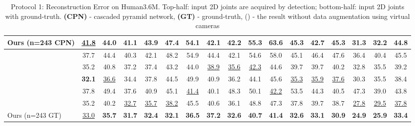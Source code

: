 \documentclass[twocolumn]{svjour3}          \smartqed  \usepackage{graphicx}
\begin{document}
\begin{table*}
\begin{center}
{\begin{tabular}{l|ccccccccccccccc|c}
			\midrule
			Ours (n=243 CPN) &  \underline{41.8} &\textbf{44.0} & \textbf{41.1} & \textbf{43.9} & \textbf{47.4} &\textbf{54.1} & \textbf{42.1} &  \textbf{42.2} & \textbf{55.3} & \textbf{63.6} & \textbf{45.3} & \textbf{42.7} & 45.3 & \textbf{31.3} & \textbf{32.2} & \textbf{44.8}\\
          \midrule
			\midrule
\citep{Martinez2017} & 37.7 & 44.4 & 40.3 & 42.1 & 48.2 & 54.9 & 44.4 & 42.1 & 54.6 & 58.0 & 45.1 & 46.4 & 47.6 & 36.4 & 40.4 & 45.5 \\
\citep{Hossain2018} & 35.2 & 40.8 & 37.2 & 37.4 & 43.2 & 44.0 & \underline{38.9} & \underline{35.6} & \underline{42.3} & 44.6 & 39.7 & 39.7 & 40.2 & 32.8 & 35.5 & 39.2\\
\citep{lee2018} & \textbf{32.1} & \underline{36.6} &  34.4& 37.8 & 44.5 & 49.9 & 40.9 & 36.2 & 44.1 & 45.6 & \underline{35.3} & \underline{35.9} & \underline{37.6} & 30.3 & 35.5 & 38.4\\
\citep{zhao2019semantic} & 37.8 & 49.4 & 37.6 & 40.9 & 45.1 & \underline{41.4} & 40.1 & 48.3 & 50.1 & \underline{42.2} & 53.5 & 44.3 & 40.5 & 47.3 & 39.0 & 43.8\\
\citep{Pavllo2019} & 35.2 & 40.2 & \underline{32.7} & \underline{35.7} & \underline{38.2} & 45.5 & 40.6 & 36.1 & 48.8 & 47.3 & 37.8 & 39.7 & 38.7 & \underline{ 27.8} & \underline{29.5} & \underline{37.8}\\
			\midrule
			Ours (n=243 GT) & \underline{33.0} &  \textbf{35.7} & \textbf{31.7} & \textbf{32.4} & \textbf{32.1} & \textbf{36.5} & \textbf{37.2} &\textbf{32.6} &\textbf{40.7} & \textbf{41.4} & \textbf{32.6} & \textbf{33.1} & \textbf{30.9} & \textbf{24.9} & \textbf{25.9} & \textbf{33.4}\\

			\bottomrule
		\end{tabular}
		}
\end{center}
\caption{Protocol 1: Reconstruction Error on Human3.6M.  Top-half: input 2D joints are acquired by detection; bottom-half: input 2D joints with ground-truth. {\bf (CPN)} - cascaded pyramid network, {\bf (GT)} - ground-truth, () - the result without data augmentation using virtual cameras}
\label{tb:tb1}
\end{table*}
\end{document}
